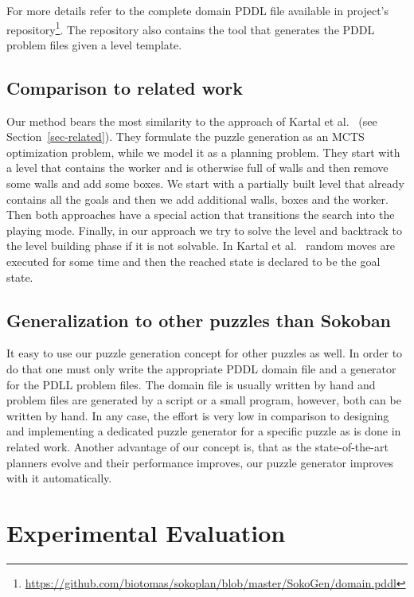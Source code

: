 \documentclass[runningheads]{llncs}
\begin{document}
For more details refer to the complete domain PDDL file available in project's 
repository\footnote{\url{https://github.com/biotomas/sokoplan/blob/master/SokoGen/domain.pddl}}.
The repository also contains the tool that generates the PDDL problem files given a level template.


\subsection{Comparison to related work}
Our method bears the most similarity to the approach of Kartal et al.~\cite{kartal2016data} (see Section~\ref{sec-related}).
They formulate the puzzle generation as an MCTS optimization problem, while we model it as a planning
problem. They start with a level that contains the worker and is otherwise full of walls and then remove some
walls and add some boxes. We start with
a partially built level that already contains all the goals and then we add additional walls, boxes and the worker.
Then both approaches have a special action that transitions the search into the playing mode.
Finally, in our approach we try to solve the level and backtrack to the level building phase if it is not solvable.
In Kartal et al.~\cite{kartal2016data} random moves are executed for some time and then the reached state is
declared to be the goal state.

\subsection{Generalization to other puzzles than Sokoban}
It easy to use our puzzle generation concept for other puzzles as well. In order to
do that one must only write the appropriate PDDL domain file and a generator for the PDLL problem files. 
The domain file is usually written by hand and problem files are generated by a script or a small program,
however, both can be written by hand. In any case, the effort is very low in comparison to designing and
implementing a dedicated puzzle generator for a specific puzzle as is done in related work.
Another advantage of our concept is, that as the state-of-the-art planners evolve and their performance
improves, our puzzle generator improves with it automatically.

\section{Experimental Evaluation}
\end{document}
